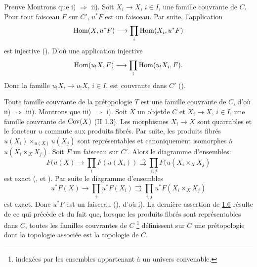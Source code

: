 \documentclass[10pt]{../fichiers-configuration-latex/smfart}
\begin{document}
\begin{enonce*}[remark]{Preuve}
Montrons que i) $\Rightarrow$ ii). Soit $X_i\rightarrow X$, $i\in
I$, une famille couvrante de $C$. Pour tout faisceau $F$ sur $C'$,
$u^\ast F$ est un faisceau. Par suite, l'application
$$
\operatorname{Hom}(X,u^\ast F)\longrightarrow \prod_i\operatorname{Hom}(X_i,u^\ast F)
$$
est injective (). D'où une application injective
$$
\operatorname{Hom}(u_{!}X,F)\longrightarrow \prod_i \operatorname{Hom}(u_{!}X_i, F){}.
$$
Donc la famille $u_{!}X_i\rightarrow u_{!}X$, $i\in I$, est
couvrante dans $C'$ ().

Toute famille couvrante de la prétopologie $T$ est une famille
couvrante de $C$, d'où ii) $\Rightarrow$ iii). Montrons que iii)
$\Rightarrow$ i). Soit $X$ un objet\pageoriginale de $C$ et
$X_i\rightarrow X$, $i\in I$, une famille couvrante de $\operatorname{Cov}(X)$ (II
1.3). Les morphismes $X_i\rightarrow X$ sont quarrables et le
foncteur $u$ commute aux produits fibrés. Par suite, les
produits fibrés $u(X_i)\times_{u(X)} u(X_j)$ sont
représentables et canoniquement isomorphes à $u(X_i\times_X
X_j)$. Soit $F$ un faisceau sur $C'$. Alors le diagramme
d'ensembles:
$$
F(u(X)\rightarrow \prod_i F(u(X_i))\rightrightarrows
\prod_{i,j}F(u(X_i\times_X X_j)
$$
est exact (,  et ). Par
suite le diagramme d'ensembles
$$
u^\ast F(X)\rightarrow \prod_i u^\ast F(X_i)\rightrightarrows
\prod_{i,j}u^\ast F(X_i\times_X X_j)
$$
est exact. Donc $u^\ast F$ est un faisceau (), d'où
i). La dernière assertion de \hyperref[III.prop1.6]{1.6} résulte de ce
qui précède et du fait que, lorsque les produits fibrés
sont représentables dans $C$, toutes les familles couvrantes de
$C$ \footnote[1]{indexées par les
  ensembles appartenant à un univers convenable.} définissent sur
$C$ une prétopologie dont la topologie associée est la
topologie de $C$.
\end{enonce*}
\end{document}

